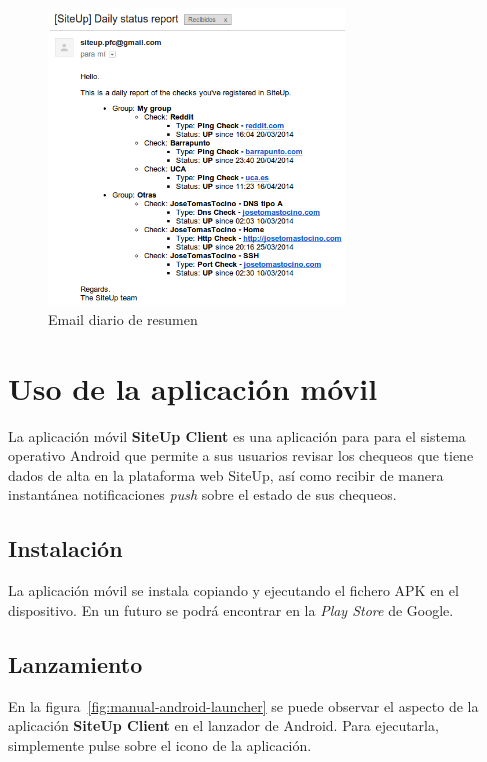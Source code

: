 \begin{figure}[hbtp]
  \centering
  \includegraphics[width=0.7\textwidth]{apendice_manual_usuario/email_resumen.png}
  \caption{Email diario de resumen}
  \label{fig:email-resumen}
\end{figure}


\section{Uso de la aplicación móvil}

La aplicación móvil \textbf{SiteUp Client} es una aplicación para para el
sistema operativo Android que permite a sus usuarios revisar los chequeos que
tiene dados de alta en la plataforma web SiteUp, así como recibir de manera
instantánea notificaciones \textit{push} sobre el estado de sus chequeos.

\subsection{Instalación}

La aplicación móvil se instala copiando y ejecutando el fichero APK en el
dispositivo. En un futuro se podrá encontrar en la \textit{Play Store} de
Google.

\subsection{Lanzamiento}

En la figura~\ref{fig:manual-android-launcher} se puede observar el aspecto de
la aplicación \textbf{SiteUp Client} en el lanzador de Android. Para ejecutarla,
simplemente pulse sobre el icono de la aplicación.


